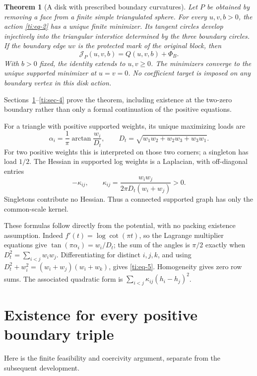 \documentclass[11pt]{article}
\numberwithin{equation}{section}
\newtheorem{theorem}{Theorem}[section]
\theoremstyle{definition}\newtheorem{definition}[theorem]{Definition}
\theoremstyle{remark}\newtheorem{remark}[theorem]{Remark}
\begin{document}
\begin{theorem}[A disk with prescribed boundary curvatures]
\label{ti:disk}
Let \(P\) be obtained by removing a face from a finite simple
triangulated sphere. For every \(u,v,b>0\), the action
\eqref{ti:eq-2} has a unique finite minimizer. Its tangent circles
develop injectively into the triangular interstice determined by the
three boundary circles. If the boundary edge \(uv\) is the protected
mark of the original block, then
\[
 \mathcal J_P(u,v,b)=Q(u,v,b)+\Phi_B.
\]
With \(b>0\) fixed, the identity extends to \(u,v\ge0\). The
minimizers converge to the unique supported minimizer at \(u=v=0\).
No coefficient target is imposed on any boundary vertex in this
disk action.
\end{theorem}
Sections~\ref{ti:sec-2}--\ref{ti:sec-4} prove the theorem, including
existence at the two-zero boundary rather than only a formal
continuation of the positive equations.

For a triangle with positive supported weights, its unique maximizing loads are
\begin{equation}\label{ti:eq-4}
\alpha_i=\frac1\pi\arctan\frac{w_i}{D_t},
\qquad D_t=\sqrt{w_1w_2+w_2w_3+w_3w_1}.
\end{equation}
For two positive weights this is interpreted on those two corners; a singleton has load \(1/2\). The Hessian in supported log weights is a Laplacian, with off-diagonal entries
\begin{equation}\label{ti:eq-5}
-\kappa_{ij},\qquad
\kappa_{ij}=\frac{w_iw_j}{2\pi D_t(w_i+w_j)}>0.
\end{equation}
Singletons contribute no Hessian. Thus a connected supported graph has only the common-scale kernel.

These formulas follow directly from the potential, with no packing
existence assumption. Indeed \(f'(t)=\log\cot(\pi t)\), so the
Lagrange multiplier equations give
\(\tan(\pi\alpha_i)=w_i/D_t\); the sum of the angles is \(\pi/2\)
exactly when \(D_t^2=\sum_{i<j}w_iw_j\). Differentiating for
distinct \(i,j,k\), and using
\(D_t^2+w_i^2=(w_i+w_j)(w_i+w_k)\), gives
\eqref{ti:eq-5}. Homogeneity gives zero row sums. The associated
quadratic form is \(\sum_{i<j}\kappa_{ij}(h_i-h_j)^2\).

\section{Existence for every positive boundary triple}\label{ti:sec-2}

Here is the finite feasibility and coercivity argument, separate from the subsequent development.
\end{document}
